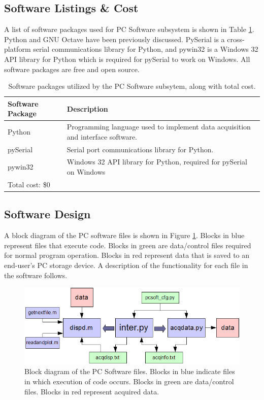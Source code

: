 \subsection[Software Listings \& Cost]{Software Listings \& Cost}

A list of software packages used for PC Software subsystem is shown in Table \ref{tab:software packages}. 
Python and GNU Octave have been previously discussed. PySerial is a cross-platform serial 
communications library for Python, and pywin32 is a Windows 32 API library for Python which is 
required for pySerial to work on Windows. All software packages are free and open source.


\begin{table}[h]
\begin{tabular}{l | p{8cm}}
	Software Package & Description \\ \hline
	Python & Programming language used to implement data acquisition and interface software. \\ 
	\hline
	pySerial & Serial port communications library for Python. \\
	\hline
	pywin32 & Windows 32 API library for Python, required for pySerial on Windows \\
	\hline
	\multicolumn{2}{l}{Total cost: \$0} \\
\end{tabular}
\caption[Software packages]{Software packages utilized by the PC Software subsytem, along with total cost.}
\label{tab:software packages}
\end{table}


\subsection[Software Design]{Software Design}
A block diagram of the PC software files is shown in Figure \ref{fig:pcsoft files diagram}. Blocks 
in blue represent files that execute code. Blocks in green are data/control files required for normal 
program operation. Blocks in red represent data that is saved to an end-user's PC storage device.
 A description of the functionality for each file in the software follows.


\begin{figure}[bhp]
\begin{center}
\includegraphics[scale=0.65]{../drawings/pcsoft_files_diagram.png}
\end{center}
\caption[PC Software Files Block Diagram]{Block diagram of the PC Software files. Blocks in blue
indicate files in which execution of code occurs. Blocks in green are data/control files. Blocks
in red represent acquired data.}
\label{fig:pcsoft files diagram}
\end{figure}


